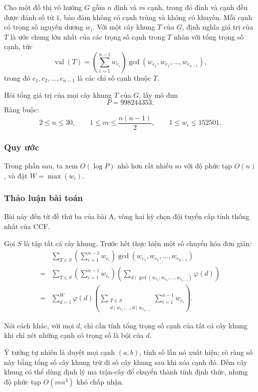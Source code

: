 \documentclass[11pt]{article}
\begin{document}
Cho một đồ thị vô hướng \(G\) gồm \(n\) đỉnh và \(m\) cạnh, trong đó đỉnh và cạnh
đều được đánh số từ \(1\), bảo đảm không có cạnh trùng và không có khuyên. Mỗi
cạnh có trọng số nguyên dương \(w_i\). Với một cây khung \(T\) của \(G\), định
nghĩa giá trị của \(T\) là ước chung lớn nhất của các trọng số cạnh trong \(T\)
nhân với tổng trọng số cạnh, tức
\[
  \operatorname{val}(T)=
  \left(\sum_{i=1}^{n-1} w_{e_i}\right)
  \gcd(w_{e_1},w_{e_2},\ldots,w_{e_{n-1}}),
\]
trong đó \(e_1,e_2,\ldots,e_{n-1}\) là các chỉ số cạnh thuộc \(T\).

Hỏi tổng giá trị của mọi cây khung \(T\) của \(G\), lấy mô đun
\[
  P=998244353.
\]
Ràng buộc:
\[
  2\le n\le 30,\qquad 1\le m\le \frac{n(n-1)}2,\qquad
  1\le w_i\le 152501.
\]

\subsubsection{Quy ước}

Trong phần sau, ta xem \(O(\log P)\) nhỏ hơn rất nhiều so với độ phức tạp
\(O(n)\), và đặt \(W=\max(w_i)\).

\subsubsection{Thảo luận bài toán}

Bài này đến từ đề thứ ba của bài A, vòng hai kỳ chọn đội tuyển cấp tỉnh thống
nhất của CCF.

Gọi \(S\) là tập tất cả cây khung. Trước hết thực hiện một số chuyển hóa đơn
giản:
\[
\begin{aligned}
&\sum_{T\in S}\left(\sum_{i=1}^{n-1}w_{e_i}\right)
  \gcd(w_{e_1},w_{e_2},\ldots,w_{e_{n-1}})\\
={}&
\sum_{T\in S}\left(\sum_{i=1}^{n-1}w_{e_i}\right)
  \left(\sum_{d\mid \gcd(w_{e_1},w_{e_2},\ldots,w_{e_{n-1}})}\varphi(d)\right)\\
={}&
\sum_{d=1}^W \varphi(d)
  \left(\sum_{\substack{T\in S\\ d\mid w_{e_1},\ldots,d\mid w_{e_{n-1}}}}
  \sum_{i=1}^{n-1}w_{e_i}\right).
\end{aligned}
\]

Nói cách khác, với mọi \(d\), chỉ cần tính tổng trọng số cạnh của tất cả cây
khung khi chỉ xét những cạnh có trọng số là bội của \(d\).

Ý tưởng tự nhiên là duyệt mọi cạnh \((a,b)\), tính số lần nó xuất hiện; rõ ràng
số này bằng tổng số cây khung trừ đi số cây khung sau khi xóa cạnh đó. Đếm cây
khung có thể dùng định lý ma trận-cây để chuyển thành tính định thức, nhưng độ
phức tạp \(O(mn^3)\) khó chấp nhận.
\end{document}
